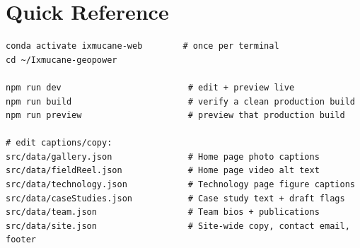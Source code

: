 \documentclass[11pt]{article}
\begin{document}
\section*{Quick Reference}
\begin{codebox}
\begin{Verbatim}
conda activate ixmucane-web        # once per terminal
cd ~/Ixmucane-geopower

npm run dev                         # edit + preview live
npm run build                       # verify a clean production build
npm run preview                     # preview that production build

# edit captions/copy:
src/data/gallery.json               # Home page photo captions
src/data/fieldReel.json             # Home page video alt text
src/data/technology.json            # Technology page figure captions
src/data/caseStudies.json           # Case study text + draft flags
src/data/team.json                  # Team bios + publications
src/data/site.json                  # Site-wide copy, contact email, footer
\end{Verbatim}
\end{codebox}
\end{document}
